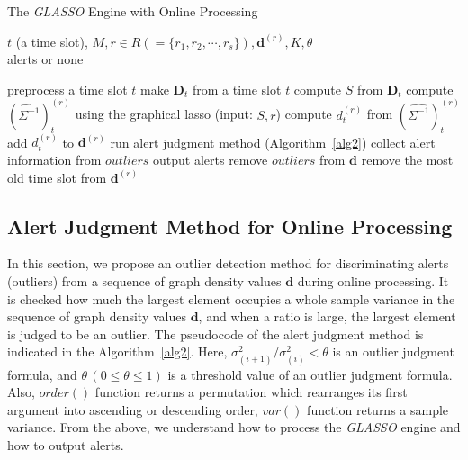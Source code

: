 \documentclass[conference]{IEEEtran}
\begin{document}
\begin{algorithm}[tb]
\caption{The {\it GLASSO} Engine with Online Processing}
\label{alg1}
\begin{algorithmic}[1]
  \REQUIRE $t$ (a time slot), $M, r \in R ( = \{r_1, r_2, \cdots, r_s\} ), \bm{d}^{(r)}, K, \theta$\\
  \ENSURE alerts or none

    \STATE preprocess a time slot $t$
    \STATE make $\bm{D}_t$ from a time slot $t$
    \STATE compute $S$ from $\bm{D}_t$
      \STATE compute ${(\hat{\Sigma^{-1}})}_t^{(r)}$ using the graphical lasso (input: $S,r$)
      \STATE compute $d_t^{(r)}$ from ${(\hat{\Sigma^{-1}})}_t^{(r)}$
      \STATE add $d_t^{(r)}$ to $\bm{d}^{(r)}$
        \STATE run alert judgment method (Algorithm~\ref{alg2})
          \STATE collect alert information from $outliers$
          \STATE output alerts
          \STATE remove $outliers$ from $\bm{d}$
        \ELSE
          \STATE remove the most old time slot from $\bm{d}^{(r)}$
        \ENDIF
  		\ENDIF
  	\ENDFOR
  \ENDFOR
\end{algorithmic}
\end{algorithm}





\subsection{Alert Judgment Method for Online Processing}
In this section, we propose an outlier detection method for discriminating alerts (outliers) from a sequence of graph density values $\bm{d}$ during online processing.
It is checked how much the largest element occupies a whole sample variance in the sequence of graph density values $\bm{d}$, and when a ratio is large, the largest element is judged to be an outlier.
The pseudocode of the alert judgment method is indicated in the Algorithm~\ref{alg2}.
Here, $\sigma^{2}_{(i+1)}/\sigma^{2}_{(i)}<\theta$ is an outlier judgment formula, and $\theta \, (0\leq \theta \leq 1)$ is a threshold value of an outlier judgment formula.
Also, $order()$ function returns a permutation which rearranges its first argument into ascending or descending order, $var()$ function returns a sample variance.
From the above, we understand how to process the {\it GLASSO} engine and how to output alerts.
\end{document}
